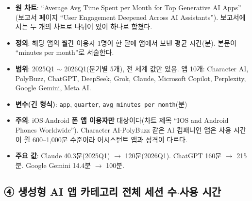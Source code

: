 \documentclass[11pt]{article}
\begin{document}
\begin{itemize}
  \item \textbf{원 차트}: ``Average Avg Time Spent per Month for Top Generative AI Apps'' (보고서 페이지 ``User Engagement Deepened Across AI Assistants''). 보고서에서는 두 개의 차트로 나뉘어 있어 하나로 합쳤다.
  \item \textbf{정의}: 해당 앱의 월간 이용자 1명이 한 달에 앱에서 보낸 평균 시간(분). 본문이 ``minutes per month''로 서술한다.
  \item \textbf{범위}: 2025Q1 $\sim$ 2026Q1(분기별 5개), 전 세계 값만 있음. 앱 10개: Character AI, PolyBuzz, ChatGPT, DeepSeek, Grok, Claude, Microsoft Copilot, Perplexity, Google Gemini, Meta AI.
  \item \textbf{변수(긴 형식)}: \texttt{app}, \texttt{quarter}, \texttt{avg\_minutes\_per\_month}(분)
  \item \textbf{주의}: iOS$\cdot$Android \textbf{폰 앱 이용자만} 대상이다(차트 제목 ``IOS and Android Phones Worldwide''). Character AI$\cdot$PolyBuzz 같은 AI 컴패니언 앱은 사용 시간이 월 600--1,000분 수준이라 어시스턴트 앱과 성격이 다르다.
  \item \textbf{주요 값}: Claude 40.3분(2025Q1) $\to$ 120분(2026Q1). ChatGPT 160분 $\to$ 215분. Google Gemini 14.4분 $\to$ 100분.
\end{itemize}

\subsection{④ 생성형 AI 앱 카테고리 전체 세션 수$\cdot$사용 시간}
\end{document}
